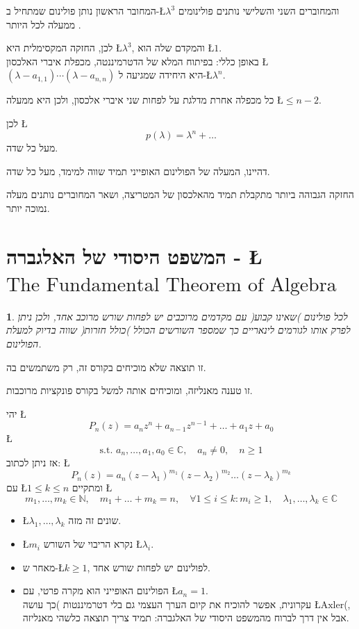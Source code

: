 \documentclass[english,hebrew]{article}
\theoremstyle{plain}
\newtheorem*{thm*}{\protect\theoremname}
\providecommand{\theoremname}{משפט}
\begin{document}
המחובר הראשון נותן פולינום שמתחיל ב-\L{$\lambda^{3}$} והמחוברים השני
והשלישי נותנים פולינומים ממעלה לכל היותר {\endL}.

לכן, החזקה המקסימלית היא \L{$\lambda^{3}$}, והמקדם שלה הוא \L{$1$}.\\

באופן כללי: בפיתוח המלא של הדטרמיננטה, מכפלת איברי האלכסון \L{$(\lambda-a_{1,1})\cdots(\lambda-a_{n,n})$}
היא היחידה שמגיעה ל-\L{$\lambda^{n}$}.

כל מכפלה אחרת מדלגת על לפחות שני איברי אלכסון, ולכן היא ממעלה \L{$\leq n-2$}.

לכן \L{%
\[
p(\lambda)=\lambda^{n}+\dots
\]
}%
 מעל כל שדה.

דהיינו, המעלה של הפולינום האופייני תמיד שווה למימד, מעל כל שדה.

החזקה הגבוהה ביותר מתקבלת תמיד מהאלכסון של המטריצה, ושאר המחוברים
נותנים מעלה נמוכה יותר.

\part{המשפט היסודי של האלגברה - \L{$\text{The Fundamental Theorem of Algebra}$}}
\begin{thm*}
לכל פולינום )שאינו קבוע( עם מקדמים מרוכבים יש לפחות שורש מרוכב אחד,
ולכן ניתן לפרק אותו לגורמים לינאריים כך שמספר השורשים הכולל )כולל
חזרות( שווה בדיוק למעלת הפולינום.
\end{thm*}
זו תוצאה שלא מוכיחים בקורס זה, רק משתמשים בה.

זו טענה מאנליזה, ומוכיחים אותה למשל בקורס פונקציות מרוכבות.

יהי \L{%
\[
P_{n}(z)=a_{n}z^{n}+a_{n-1}z^{n-1}+\dots+a_{1}z+a_{0}
\]
}%
\L{%
\[
\text{s.t. }a_{n},\dots,a_{1},a_{0}\in\mathbb{C},\quad a_{n}\neq0,\quad n\geq1
\]
}%
אז ניתן לכתוב: \L{%
\[
P_{n}(z)=a_{n}(z-\lambda_{1})^{m_{1}}(z-\lambda_{2})^{m_{2}}\dots(z-\lambda_{k})^{m_{k}}
\]
}%
עם \L{$1\le k\le n$} ומתקיים \L{%
\[
m_{1},\dots,m_{k}\in\mathbb{N},\quad m_{1}+\dots+m_{k}=n,\quad\forall1\le i\le k:m_{i}\ge1,\quad\lambda_{1},\dots,\lambda_{k}\in\mathbb{C}
\]
}%

\begin{itemize}
\item \L{$\lambda_{1},\dots,\lambda_{k}$} שונים זה מזה.
\item \L{$m_{i}$} נקרא הריבוי של השורש \L{$\lambda_{i}$}.
\item מאחר ש-\L{$k\geq1$}, לפולינום יש לפחות שורש אחד.
\item הפולינום האופייני הוא מקרה פרטי, עם \L{$a_{n}=1$}.\\
עקרונית, אפשר להוכיח את קיום הערך העצמי גם בלי דטרמיננטות )כך עושה
\L{$\text{Axler}$}(, אבל אין דרך לברוח מהמשפט היסודי של האלגברה:
תמיד צריך תוצאה כלשהי מאנליזה.
\end{itemize}
\end{document}
